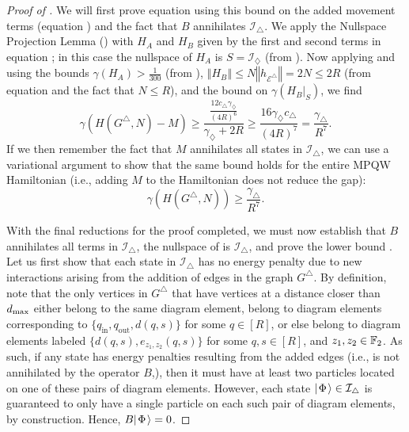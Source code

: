 \documentclass[../thesis-main/thesis-main]{subfiles}
\begin{document}
\begin{proof}[Proof of \protect{}]
We will first prove equation  using this bound on the added movement terms (equation ) and the fact that $B$ annihilates $\mathcal{I}_{\triangle}$. We apply the Nullspace Projection Lemma () with $H_{A}$ and $H_{B}$ given by the first and second terms in equation ; in this case the nullspace of $H_{A}$ is $S=\mathcal{I}_{\diamondsuit}$ (from ). Now applying  and using the bounds $\gamma(H_{A})>\frac{1}{300}$ (from ), $\left\Vert H_{B}\right\Vert \leq N\left\Vert h_{\mathcal{E}^{\triangle}}\right\Vert =2N\leq2R$ (from equation  and the fact that $N\leq R$), and the bound  on $\gamma(H_{B}|_{S})$, we find
\begin{equation}
  \gamma(H(G^{\triangle},N)-M)\geq\frac{\frac{12c_{\triangle}\gamma_{\diamondsuit}}{(4R)^{6}}}{\gamma_{\diamondsuit}+2R}\geq\frac{16 \gamma_{\diamondsuit} c_{\triangle}}{(4R)^7}=\frac{\gamma_\triangle}{R^{7}}.
\end{equation}
If we then remember the fact that $M$ annihilates all states in $\mathcal{I}_{\triangle}$, we can use a variational argument to show that the same bound holds for the entire MPQW Hamiltonian (i.e., adding $M$ to the Hamiltonian does not reduce the gap):
\begin{equation}
  \gamma(H(G^{\triangle},N)) \geq \frac{\gamma_{\triangle}}{R^7}.
\end{equation}

With the final reductions for the proof completed, we must now establish that $B$ annihilates all terms in $\mathcal{I}_{\triangle}$, the nullspace of  is $\mathcal{I}_{\triangle}$, and prove the lower bound .  Let us first show that each state in $\mathcal{I}_{\triangle}$ has no energy penalty due to new interactions arising from the addition of edges in the graph $G^{\triangle}$.  By definition, note that the only vertices in $G^{\triangle}$ that have vertices at a distance closer than $d_{\text{max}}$ either belong to the same diagram element, belong to diagram elements corresponding to $\{q_{\text{in}}, q_{\text{out}}, d(q,s)\}$ for some $q\in [R]$, or else belong to diagram elements labeled $\{d(q,s), e_{z_1,z_2}(q,s)\}$ for some $q,s\in [R]$, and $z_1,z_2\in \mathbb{F}_2$.  As such, if any state has energy penalties resulting from the added edges (i.e., is not annihilated by the operator $B$,), then it must have at least two particles located on one of these pairs of diagram elements.  However, each state $|\mspace{2mu} \Phi \mspace{2mu} \rangle\in \mathcal{I}_{\triangle}$ is guaranteed to only have a single particle on each such pair of diagram elements, by construction.  Hence, $B|\mspace{2mu} \Phi \mspace{2mu} \rangle = 0$.


\end{proof}
\end{document}
